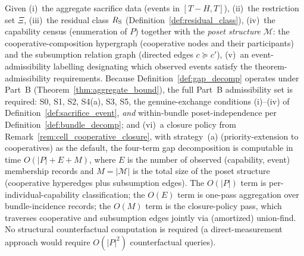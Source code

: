 \begin{proposition}
\label{prop:gap_computable}
Given
(i)~the aggregate sacrifice data (events in $[T - H, T]$),
(ii)~the restriction set $\Xi$,
(iii)~the residual class $R_{\mathrm{S}}$
(Definition~\ref{def:residual_class}),
(iv)~the capability census (enumeration of $P$) together with
the \emph{poset structure} $\mathcal{M}$: the
cooperative-composition hypergraph (cooperative nodes and their
participants) and the subsumption relation graph (directed
edges $c \succeq c'$),
(v)~an event-admissibility labelling designating which observed
events satisfy the theorem-admissibility requirements.  Because
Definition~\ref{def:gap_decomp} operates under Part~B
(Theorem~\ref{thm:aggregate_bound}), the full Part~B
admissibility set is required: S0, S1, S2, S4(a), S3, S5, the
genuine-exchange conditions (i)--(iv) of
Definition~\ref{def:sacrifice_event}, \emph{and} within-bundle
poset-independence per Definition~\ref{def:bundle_decomp}; and
(vi)~a closure policy from
Remark~\ref{rem:cell_cooperative_closure}, with strategy~(a)
(priority-extension to cooperatives) as the default,
the four-term gap decomposition is computable in time
$O(|P| + E + M)$, where $E$ is the number of observed
(capability, event) membership records and $M = |\mathcal{M}|$
is the total size of the poset structure (cooperative
hyperedges plus subsumption edges).  The $O(|P|)$ term is
per-individual-capability classification; the $O(E)$ term is
one-pass aggregation over bundle-incidence records; the $O(M)$
term is the closure-policy pass, which traverses cooperative
and subsumption edges jointly via (amortized) union-find.
No structural counterfactual computation is required (a
direct-measurement approach would require $O(|P|^2)$
counterfactual queries).
\end{proposition}

